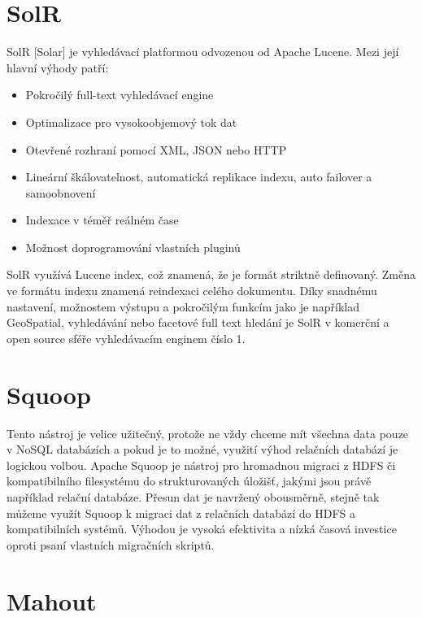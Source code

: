 \section{SolR}

SolR [Solar] je vyhledávací platformou odvozenou od Apache Lucene. Mezi její hlavní výhody patří:

\begin{itemize}
\item Pokročilý full-text vyhledávací engine
\item Optimalizace pro vysokoobjemový tok dat
\item Otevřené rozhraní pomocí XML, JSON nebo HTTP
\item Lineární škálovatelnost, automatická replikace indexu, auto failover a samoobnovení
\item Indexace v téměř reálném čase
\item Možnost doprogramování vlastních pluginů
\end{itemize}

SolR využívá Lucene index, což znamená, že je formát striktně definovaný. Změna ve formátu indexu znamená reindexaci celého dokumentu. Díky snadnému nastavení, možnostem výstupu a pokročilým funkcím jako je například GeoSpatial, vyhledávání nebo facetové full text hledání je SolR v komerční a open source sféře vyhledávacím enginem číslo 1.


\section{Squoop}

Tento nástroj je velice užitečný, protože ne vždy chceme mít všechna data pouze v NoSQL databázích a pokud je to možné, využití výhod relačních databází je logickou volbou. Apache Squoop je nástroj pro hromadnou migraci z HDFS či kompatibilního filesystému do strukturovaných úložišť, jakými jsou právě například relační databáze. Přesun dat je navržený obousměrně, stejně tak můžeme využít Squoop k migraci dat z relačních databází do HDFS a kompatibilních systémů. Výhodou je vysoká efektivita a nízká časová investice oproti psaní vlastních migračních skriptů.

\section{Mahout}

